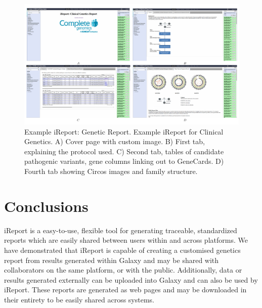 \begin{figure}[h!]
   \includegraphics[width=\textwidth]{chapters/images/iReport/Hiltemann_geneticreport.jpg}
    \caption{Example iReport: Genetic Report. Example iReport for Clinical Genetics. A) Cover page with custom image. B) First tab, explaining the protocol used. C) Second tab, tables of candidate pathogenic variants, gene columns linking out to GeneCards. D) Fourth tab showing Circos images and family structure.  }
    \label{fig:trioscreenshots}
\end{figure}

\section*{Conclusions}
iReport is a easy-to-use, flexible tool for generating traceable, standardized reports which are easily shared between users within and across platforms. We have demonstrated that iReport is capable of creating a customised genetics report from results generated within Galaxy and may be shared with collaborators on the same platform, or with the public. Additionally, data or results generated externally can be uploaded into Galaxy and can also be used by iReport. These reports are generated as web pages and may be downloaded in their entirety to be easily shared across systems.

